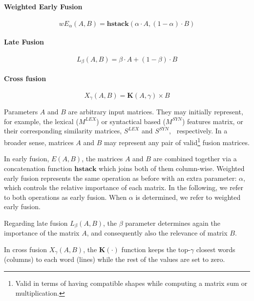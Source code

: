 \paragraph{Weighted Early Fusion}
\begin{equation}
wE_\alpha(A,B) = \mathbf{hstack}(\alpha\cdot A , (1-\alpha)\cdot B)
\end{equation}
\paragraph{Late Fusion}
\begin{equation} \label{eq:late-fusion}
L_\beta(A,B) = \beta \cdot A + (1 - \beta)\cdot B
\end{equation}
\paragraph{Cross fusion}
\begin{equation}
X_{\gamma}(A,B) = \mathbf{K}(A,\gamma) \times B
\end{equation}


Parameters $A$ and $B$ are arbitrary input matrices. They may initially represent, for example,  the lexical ($M^{LEX}$) or syntactical based ($M^{SYN}$) features matrix, or their  corresponding similarity matrices, $S^{LEX}$ and  $S^{SYN}$, ~respectively. In a broader sense, matrices $A$ and $B$ may represent any pair of valid\footnote{Valid in terms of having compatible shapes while computing a matrix sum or multiplication.} fusion matrices. 

In early fusion, $E(A,B)$, the matrices $A$ and $B$ are combined together via a concatenation function $\mathbf{hstack}$ which joins both of them column-wise. Weighted early fusion  represents the same operation as before with an extra parameter: $\alpha$, which controls the relative importance of each matrix. In the following, we refer to both operations as early fusion. When $\alpha$ is determined, we refer to weighted early fusion.

Regarding late fusion $L_\beta(A,B)$, the  $\beta$ parameter determines again the importance of the  matrix $A$,  and consequently also the relevance of matrix $B$.

In cross fusion $X_\gamma(A,B)$, the $\mathbf{K}(\cdot)$ function keeps the top-$\gamma$ closest words (columns) to each word (lines) while the rest of the values are set to zero. 

